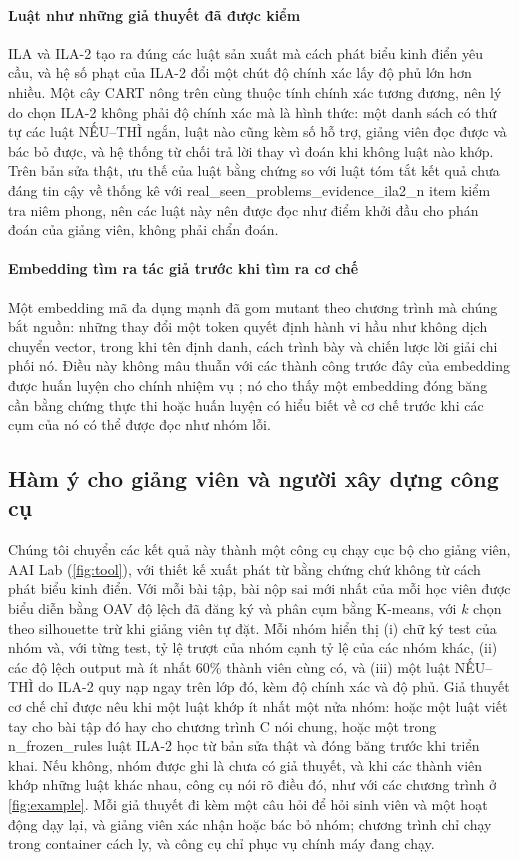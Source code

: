 \paragraph{Luật như những giả thuyết đã được kiểm}
ILA và ILA-2 tạo ra đúng các luật sản xuất mà cách phát biểu kinh điển yêu cầu, và hệ số phạt của ILA-2 đổi một chút độ chính xác lấy độ phủ lớn hơn nhiều. Một cây CART nông trên cùng thuộc tính chính xác tương đương, nên lý do chọn ILA-2 không phải độ chính xác mà là hình thức: một danh sách có thứ tự các luật NẾU--THÌ ngắn, luật nào cũng kèm số hỗ trợ, giảng viên đọc được và bác bỏ được, và hệ thống từ chối trả lời thay vì đoán khi không luật nào khớp. Trên bản sửa thật, ưu thế của luật bằng chứng so với luật tóm tắt kết quả chưa đáng tin cậy về thống kê với {{real_seen_problems_evidence_ila2_n}} item kiểm tra niêm phong, nên các luật này nên được đọc như điểm khởi đầu cho phán đoán của giảng viên, không phải chẩn đoán.

\paragraph{Embedding tìm ra tác giả trước khi tìm ra cơ chế}
Một embedding mã đa dụng mạnh đã gom mutant theo chương trình mà chúng bắt nguồn: những thay đổi một token quyết định hành vi hầu như không dịch chuyển vector, trong khi tên định danh, cách trình bày và chiến lược lời giải chi phối nó. Điều này không mâu thuẫn với các thành công trước đây của embedding được huấn luyện cho chính nhiệm vụ \citep{shi2021misconception,piech2015embeddings}; nó cho thấy một embedding đóng băng cần bằng chứng thực thi hoặc huấn luyện có hiểu biết về cơ chế trước khi các cụm của nó có thể được đọc như nhóm lỗi.

\subsection{Hàm ý cho giảng viên và người xây dựng công cụ}\label{sec:tool}
Chúng tôi chuyển các kết quả này thành một công cụ chạy cục bộ cho giảng viên, AAI Lab (\cref{fig:tool}), với thiết kế xuất phát từ bằng chứng chứ không từ cách phát biểu kinh điển. Với mỗi bài tập, bài nộp sai mới nhất của mỗi học viên được biểu diễn bằng OAV độ lệch đã đăng ký và phân cụm bằng K-means, với $k$ chọn theo silhouette trừ khi giảng viên tự đặt. Mỗi nhóm hiển thị (i) chữ ký test của nhóm và, với từng test, tỷ lệ trượt của nhóm cạnh tỷ lệ của các nhóm khác, (ii) các độ lệch output mà ít nhất 60\% thành viên cùng có, và (iii) một luật NẾU--THÌ do ILA-2 quy nạp ngay trên lớp đó, kèm độ chính xác và độ phủ. Giả thuyết cơ chế chỉ được nêu khi một luật khớp ít nhất một nửa nhóm: hoặc một luật viết tay cho bài tập đó hay cho chương trình C nói chung, hoặc một trong {{n_frozen_rules}} luật ILA-2 học từ bản sửa thật và đóng băng trước khi triển khai. Nếu không, nhóm được ghi là chưa có giả thuyết, và khi các thành viên khớp những luật khác nhau, công cụ nói rõ điều đó, như với các chương trình ở \cref{fig:example}. Mỗi giả thuyết đi kèm một câu hỏi để hỏi sinh viên và một hoạt động dạy lại, và giảng viên xác nhận hoặc bác bỏ nhóm; chương trình chỉ chạy trong container cách ly, và công cụ chỉ phục vụ chính máy đang chạy.


